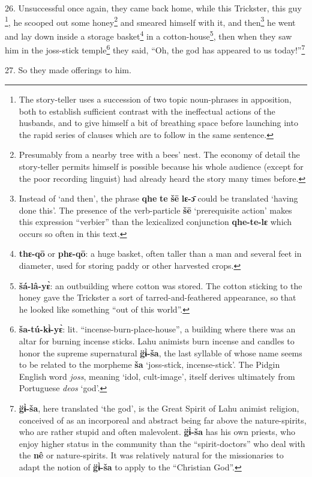26. Unsuccessful once again, they came back home, while this Trickster, this guy
\footnote{The story-teller uses a succession of two topic noun-phrases in apposition, both to establish sufficient contrast with the ineffectual actions of the husbands, and to give himself a bit of breathing space before launching into the rapid series of clauses which are to follow in the same sentence.}, he scooped out some honey\footnote{Presumably from a nearby tree with a bees' nest. The economy of detail the story-teller permits himself is possible because his whole audience (except for the poor recording linguist) had already heard the story many times before.} and smeared himself with it, and then\footnote{Instead of `and then', the phrase \textbf{qhe} \textbf{te} \textbf{šē} \textbf{lɛ-ɔ̄} could be translated `having done this'. The presence of the verb-particle \textbf{šē} `prerequisite action' makes this expression ``verbier'' than the lexicalized conjunction \textbf{qhe-te-lɛ} which occurs so often in this text.}
he went and lay down inside a storage basket\footnote{\textbf{thɛ-qō} or \textbf{phɛ-qō}: a huge basket, often taller than a man and several feet in diameter, used for storing paddy or other harvested crops.} in a cotton-house\footnote{\textbf{šá-lâ-yɛ̀}: an outbuilding where cotton was stored. The cotton sticking to the honey gave the Trickster a sort of tarred-and-feathered appearance, so that he looked like something ``out of this world''.}, then
when they saw him in the joss-stick temple\footnote{\textbf{ša-tú-kɨ̀-yɛ̀}: lit. ``incense-burn-place-house'', a building where there was an altar for burning incense sticks. Lahu animists burn incense and candles to honor the supreme supernatural \textbf{g̈ɨ̀-ša}, the last syllable of whose name seems to be related to the morpheme \textbf{ša} `joss-stick, incense-stick'. The Pidgin English word \textit{joss}, meaning `idol, cult-image', itself derives ultimately from Portuguese \textit{deos} `god'.} they said, ``Oh, the god has appeared
to us today!''\footnote{\textbf{g̈ɨ̀-ša}, here translated `the god', is the Great Spirit of Lahu animist religion, conceived of as an incorporeal and abstract being far above the nature-spirits, who are rather stupid and often malevolent. \textbf{g̈ɨ̀-ša} has his own priests, who enjoy higher status in the community than the ``spirit-doctors'' who deal with the \textbf{nê} or nature-spirits. It was relatively natural for the missionaries to adapt the notion of \textbf{g̈ɨ̀-ša} to apply to the ``Christian God''.}

27. So they made offerings to him.

